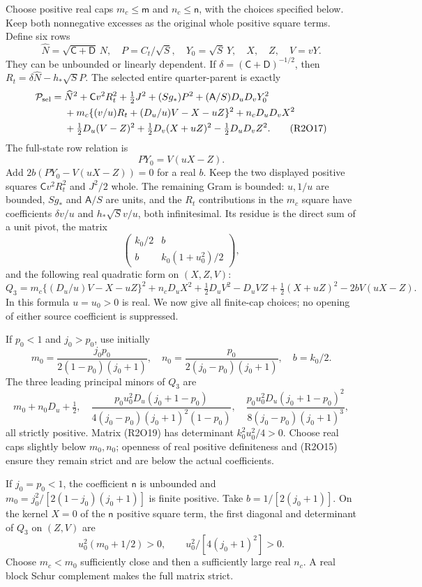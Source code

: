 Choose positive real caps $m_c\leq\mathsf m$ and
$n_c\leq\mathsf n$, with the choices specified below.  Keep both
nonnegative excesses as the original whole positive square terms.  Define six rows
\[
\widehat N=\sqrt{\mathsf C+\mathsf D}\,N,\quad
P=C_t/\sqrt S,\quad Y_0=\sqrt S\,Y,
\quad X,\quad Z,\quad V=vY.
\tag{R2O16}
\]
They can be unbounded or linearly dependent.  If
$\delta=(\mathsf C+\mathsf D)^{-1/2}$, then
$R_t=\delta\widehat N-h_*\sqrt S P$.  The selected entire
quarter-parent is exactly
\begin{align*}
\mathcal P_{\rm sel}={}&\widehat N^2+\mathsf C v^2R_t^2
 +\tfrac12J^2+(Sg_*)P^2
 +(\mathsf A/S)D_uD_vY_0^2\\
&+m_c\{(v/u)R_t+(D_u/u)V-X-uZ\}^2
 +n_cD_uD_vX^2\\
&+\tfrac12D_u(V-Z)^2+\tfrac12D_v(X+uZ)^2
 -\tfrac12D_uD_vZ^2.
\tag{R2O17}
\end{align*}
The full-state row relation is
\[
PY_0=V(uX-Z).
\tag{R2O18}
\]
Add $2b(PY_0-V(uX-Z))=0$ for a real $b$.  Keep the two displayed
positive squares $\mathsf C v^2R_t^2$ and $J^2/2$ whole.  The
remaining Gram is bounded: $u,1/u$ are bounded, $Sg_*$ and
$\mathsf A/S$ are units, and the $R_t$ contributions in the
$m_c$ square have coefficients $\delta v/u$ and
$h_*\sqrt S v/u$, both infinitesimal.  Its residue is the direct sum
of a unit pivot, the matrix
\[
\begin{pmatrix}k_0/2&b\\b&k_0(1+u_0^2)/2\end{pmatrix},
\tag{R2O19}
\]
and the following real quadratic form on $(X,Z,V)$:
\[
Q_3=m_c\{(D_u/u)V-X-uZ\}^2+n_cD_uX^2
 +\tfrac12D_uV^2-D_uVZ+\tfrac12(X+uZ)^2
 -2bV(uX-Z).
\tag{R2O20}
\]
In this formula $u=u_0>0$ is real.  We now give all finite-cap choices;
no opening of either source coefficient is suppressed.

If $p_0<1$ and $j_0>p_0$, use initially
\[
m_0=\frac{j_0p_0}{2(1-p_0)(j_0+1)},\quad
n_0=\frac{p_0}{2(j_0-p_0)(j_0+1)},\quad b=k_0/2.
\]
The three leading principal minors of $Q_3$ are
\[
m_0+n_0D_u+\tfrac12,\quad
\frac{p_0u_0^2D_u(j_0+1-p_0)}
 {4(j_0-p_0)(j_0+1)^2(1-p_0)},\quad
\frac{p_0u_0^2D_u(j_0+1-p_0)^2}
 {8(j_0-p_0)(j_0+1)^3},
\tag{R2O21}
\]
all strictly positive.  Matrix (R2O19) has determinant
$k_0^2u_0^2/4>0$.  Choose real caps slightly below $m_0,n_0$;
openness of real positive definiteness and (R2O15) ensure they remain
strict and are below the actual coefficients.

If $j_0=p_0<1$, the coefficient $\mathsf n$ is unbounded and
$m_0=j_0^2/[2(1-j_0)(j_0+1)]$ is finite positive.  Take
$b=1/[2(j_0+1)]$.  On the kernel $X=0$ of the $\mathsf n$ positive square term,
the first diagonal and determinant of $Q_3$ on $(Z,V)$ are
\[
u_0^2(m_0+1/2)>0,\qquad
u_0^2/[4(j_0+1)^2]>0.
\tag{R2O22}
\]
Choose $m_c<m_0$ sufficiently close and then a sufficiently large
real $n_c$.  A real block Schur complement makes the full matrix strict.

